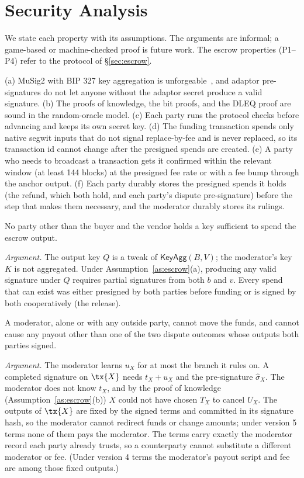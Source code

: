 \section{Security Analysis}
\label{sec:security}

We state each property with its assumptions. The arguments are informal; a game-based or machine-checked proof is future work. The escrow properties (P1--P4) refer to the protocol of \S\ref{sec:escrow}.

\begin{assumption}[Escrow]\label{as:escrow}
(a) MuSig2 with BIP 327 key aggregation is unforgeable~\citep{nick2021musig2}, and adaptor pre-signatures do not let anyone without the adaptor secret produce a valid signature. (b) The proofs of knowledge, the bit proofs, and the DLEQ proof are sound in the random-oracle model. (c) Each party runs the protocol checks before advancing and keeps its own secret key. (d) The funding transaction spends only native segwit inputs that do not signal replace-by-fee and is never replaced, so its transaction id cannot change after the presigned spends are created. (e) A party who needs to broadcast a transaction gets it confirmed within the relevant window (at least 144 blocks) at the presigned fee rate or with a fee bump through the anchor output. (f) Each party durably stores the presigned spends it holds (the refund, which both hold, and each party's dispute pre-signature) before the step that makes them necessary, and the moderator durably stores its rulings.
\end{assumption}

\begin{property}[No custody]
No party other than the buyer and the vendor holds a key sufficient to spend the escrow output.
\end{property}
\noindent\emph{Argument.} The output key $Q$ is a tweak of $\mathsf{KeyAgg}(B,V)$; the moderator's key $K$ is not aggregated. Under Assumption~\ref{as:escrow}(a), producing any valid signature under $Q$ requires partial signatures from both $b$ and $v$. Every spend that can exist was either presigned by both parties before funding or is signed by both cooperatively (the release).

\begin{property}
A moderator, alone or with any outside party, cannot move the funds, and cannot cause any payout other than one of the two dispute outcomes whose outputs both parties signed.
\end{property}
\noindent\emph{Argument.} The moderator learns $u_X$ for at most the branch it rules on. A completed signature on $\tx{X}$ needs $t_X+u_X$ and the pre-signature $\hat\sigma_X$. The moderator does not know $t_X$, and by the proof of knowledge (Assumption~\ref{as:escrow}(b)) $X$ could not have chosen $T_X$ to cancel $U_X$. The outputs of $\tx{X}$ are fixed by the signed terms and committed in its signature hash, so the moderator cannot redirect funds or change amounts; under version 5 terms none of them pays the moderator. The terms carry exactly the moderator record each party already trusts, so a counterparty cannot substitute a different moderator or fee. (Under version 4 terms the moderator's payout script and fee are among those fixed outputs.)

